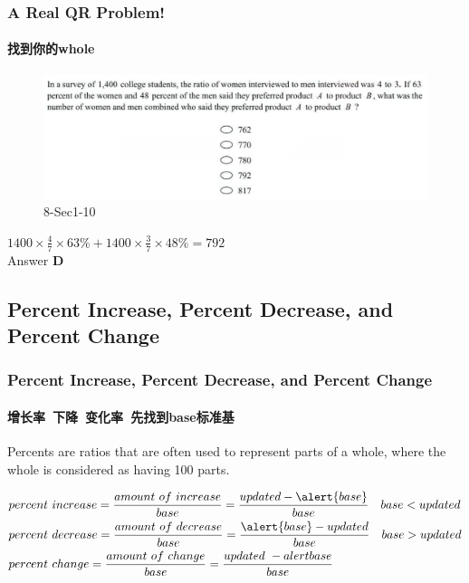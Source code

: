 \documentclass[
	11pt, %
]{beamer}
\begin{document}
\begin{frame}
	\frametitle{A Real QR Problem!}
	\framesubtitle{找到你的whole}
	\begin{figure}
		\includegraphics[width=\linewidth]{Percent_Example_Question_1.png}
		\caption{8-Sec1-10}
	\end{figure}
	\pause
$1400 \times \frac{4}{7}\times 63\% + 1400 \times\frac{3}{7}\times 48\% = 792$ \\
\pause
\bigskip
Answer \textbf{D}
\end{frame}


\subsection{Percent Increase, Percent Decrease, and Percent Change}
\begin{frame}
	\frametitle{Percent Increase, Percent Decrease, and Percent Change}
	\framesubtitle{增长率\ 下降\ 变化率\ 先找到base标准基}
	\begin{definition}
		Percents are ratios that are often used to represent parts of a \alert{whole}, where the whole is considered as having 100 \alert{parts}. 
	\end{definition}
	
	\begin{equation*}
		\begin{split}
		&percent\ increase = \frac{amount \ of \ increase}{base} = \frac{updated- \alert{base}}{base} \quad base < updated \\
		&percent\ decrease = \frac{amount \ of \ decrease}{base}  = \frac{\alert{base} - updated}{base} \quad base > updated \\
		&percent\ change = \frac{amount \ of \ change}{base} = \frac{updated\ - alert{base} }{base} \\
		\end{split}
	\end{equation*}
\end{frame}

\end{document}
